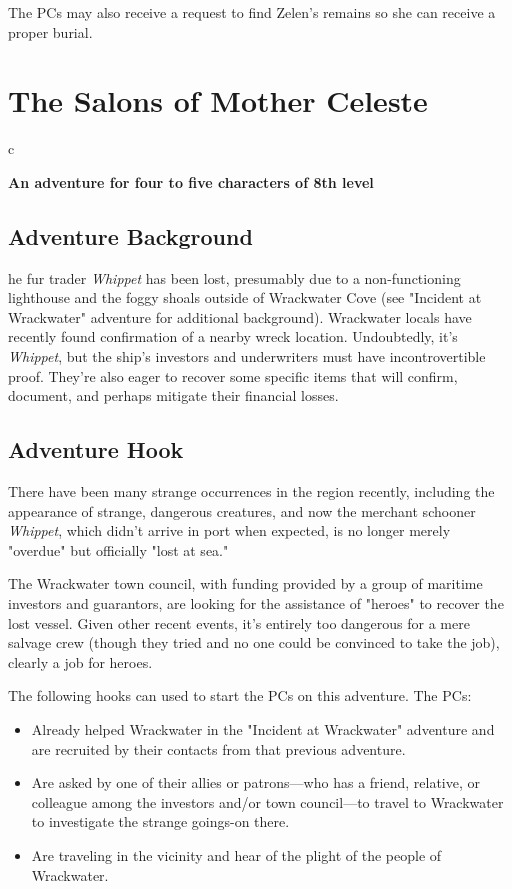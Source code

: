 \documentclass[10pt,a4paper,twoside,bg=print,twocolumn,openany,nodeprecatedcode]{dndbook}
\begin{document}
The PCs may also receive a request to find Zelen's remains so she can receive a proper burial.

\chapter{The Salons of Mother Celeste}

\begin{DndTable}{c}

\textbf{An adventure for four to five characters of 8th level}\\
\end{DndTable}

\section{Adventure Background}
he fur trader \textit{Whippet} has been lost, presumably due to a non-functioning lighthouse and the foggy shoals outside of Wrackwater Cove (see "Incident at Wrackwater" adventure for additional background). Wrackwater locals have recently found confirmation of a nearby wreck location. Undoubtedly, it's \textit{Whippet}, but the ship's investors and underwriters must have incontrovertible proof. They're also eager to recover some specific items that will confirm, document, and perhaps mitigate their financial losses.


\section{Adventure Hook}
There have been many strange occurrences in the region recently, including the appearance of strange, dangerous creatures, and now the merchant schooner \textit{Whippet}, which didn't arrive in port when expected, is no longer merely "overdue" but officially "lost at sea."

The Wrackwater town council, with funding provided by a group of maritime investors and guarantors, are looking for the assistance of "heroes" to recover the lost vessel. Given other recent events, it's entirely too dangerous for a mere salvage crew (though they tried and no one could be convinced to take the job), clearly a job for heroes.

The following hooks can used to start the PCs on this adventure. The PCs:


\begin{itemize}
\item Already helped Wrackwater in the "Incident at Wrackwater" adventure and are recruited by their contacts from that previous adventure.
\item Are asked by one of their allies or patrons—who has a friend, relative, or colleague among the investors and/or town council—to travel to Wrackwater to investigate the strange goings-on there.
\item Are traveling in the vicinity and hear of the plight of the people of Wrackwater.
\end{itemize}
\end{document}
